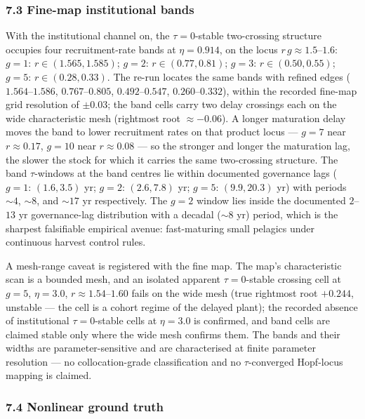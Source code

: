 \documentclass[11pt]{article}
\begin{document}
\subsubsection{7.3 Fine-map institutional
bands}\label{fine-map-institutional-bands}

With the institutional channel on, the \(\tau = 0\)-stable two-crossing
structure occupies four recruitment-rate bands at \(\eta = 0.914\), on
the locus \(r\,g \approx 1.5\)--\(1.6\): \(g = 1\):
\(r \in (1.565, 1.585)\); \(g = 2\): \(r \in (0.77, 0.81)\); \(g = 3\):
\(r \in (0.50, 0.55)\); \(g = 5\): \(r \in (0.28, 0.33)\). The re-run
locates the same bands with refined edges (\(1.564\)--\(1.586\),
\(0.767\)--\(0.805\), \(0.492\)--\(0.547\), \(0.260\)--\(0.332\)),
within the recorded fine-map grid resolution of \(\pm 0.03\); the band
cells carry two delay crossings each on the wide characteristic mesh
(rightmost root \(\approx -0.06\)). A longer maturation delay moves the
band to lower recruitment rates on that product locus --- \(g=7\) near
\(r\approx0.17\), \(g=10\) near \(r\approx0.08\) --- so the stronger and
longer the maturation lag, the slower the stock for which it carries the
same two-crossing structure. The band \(\tau\)-windows at the band
centres lie within documented governance lags (\(g=1\): \((1.6,3.5)\)
yr; \(g=2\): \((2.6,7.8)\) yr; \(g=5\): \((9.9,20.3)\) yr) with periods
\(\sim4\), \(\sim8\), and \(\sim17\) yr respectively. The \(g=2\) window
lies inside the documented \(2\)--\(13\) yr governance-lag distribution
with a decadal (\(\sim8\) yr) period, which is the sharpest falsifiable
empirical avenue: fast-maturing small pelagics under continuous harvest
control rules.

A mesh-range caveat is registered with the fine map. The map's
characteristic scan is a bounded mesh, and an isolated apparent
\(\tau = 0\)-stable crossing cell at \(g = 5\), \(\eta = 3.0\),
\(r \approx 1.54\)--\(1.60\) fails on the wide mesh (true rightmost root
\(+0.244\), unstable --- the cell is a cohort regime of the delayed
plant); the recorded absence of institutional \(\tau = 0\)-stable cells
at \(\eta = 3.0\) is confirmed, and band cells are claimed stable only
where the wide mesh confirms them. The bands and their widths are
parameter-sensitive and are characterised at finite parameter resolution
--- no collocation-grade classification and no \(\tau\)-converged
Hopf-locus mapping is claimed.

\subsubsection{7.4 Nonlinear ground truth}\label{nonlinear-ground-truth}
\end{document}
